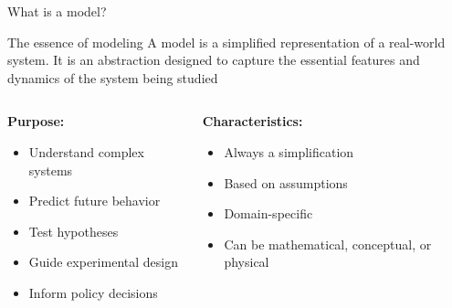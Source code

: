 \documentclass[aspectratio=169]{beamer}\usepackage[]{graphicx}\usepackage[]{xcolor}
\begin{document}
\begin{frame}{What is a model?}
    \begin{block}{The essence of modeling}
        A model is a simplified representation of a real-world system. It is an abstraction designed to capture the essential features and dynamics of the system being studied
    \end{block}
    \vspace{1cm}
    \begin{columns}
        \begin{column}{0.5\textwidth}
            \textbf{Purpose:}
            \begin{itemize}
                \item Understand complex systems
                \item Predict future behavior
                \item Test hypotheses
                \item Guide experimental design
                \item Inform policy decisions
            \end{itemize}
        \end{column}
        \begin{column}{0.5\textwidth}
            \textbf{Characteristics:}
            \begin{itemize}
                \item Always a simplification
                \item Based on assumptions
                \item Domain-specific
                \item Can be mathematical, conceptual, or physical
            \end{itemize}
        \end{column}
    \end{columns}
\end{frame}
\end{document}
